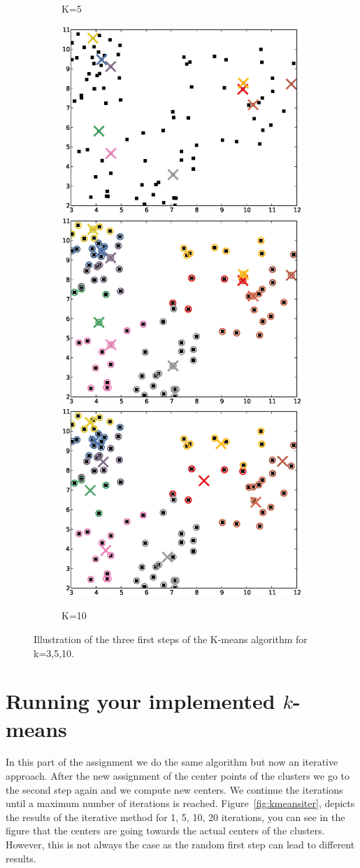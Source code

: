 \documentclass[a4paper,10pt]{article}
\begin{document}
\begin{figure}
\begin{subfigure}{1.00\textwidth}
    \caption{K=5}
  \end{subfigure}
  \begin{subfigure}{1.00\textwidth}
    \centering
    \includegraphics[width=.32\textwidth,height=.3\textheight,keepaspectratio]{figure_7.eps}
    \includegraphics[width=.32\textwidth,height=.3\textheight,keepaspectratio]{figure_8.eps}
    \includegraphics[width=.32\textwidth,height=.3\textheight,keepaspectratio]{figure_9.eps}
    \caption{K=10}
  \end{subfigure}
  \caption{Illustration of the three first steps of the K-means algorithm for k=3,5,10.}
  \label{fig:kmeanssimple}
\end{figure}

\section{Running your implemented $k$-means}
In this part of the assignment we do the same algorithm but now an iterative approach. After the new assignment of the center points of the clusters we go to the second step again and we compute new centers. We continue the iterations until a maximum number of iterations is reached. Figure~\ref{fig:kmeansiter}, depicts the results of the iterative method for 1, 5, 10, 20 iterations, you can see in the figure that the centers are going towards the actual centers of the clusters. However, this is not always the case as the random first step can lead to different results.
\end{document}
